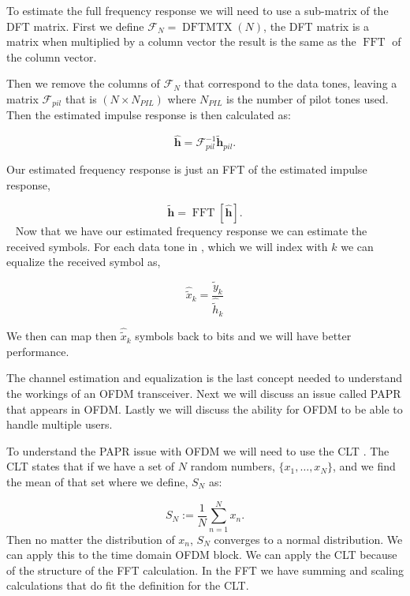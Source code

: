 To estimate the full frequency response we will need to use a sub-matrix of the \ac{DFT} matrix. First we define $\mathbf{\mathcal{F}}_N=\operatorname{DFTMTX}(N)$, the \ac{DFT} matrix is a matrix when multiplied by a column vector the result is the same as the $\operatorname{FFT}$ of the column vector.

Then we remove the columns of $\mathbf{\mathcal{F}}_N$ that correspond to the data tones, leaving a matrix $\mathbf{\mathcal{F}}_{pil}$ that is $(N\times N_{PIL})$ where $N_{PIL}$ is the number of pilot tones used. Then the estimated impulse response is then calculated as:

\begin{equation}
\hat{\mathbf{h}} = \mathbf{\mathcal{F}}_{pil}^{-1}\tilde{\mathbf{h}}_{pil}.
\end{equation}
\noindent

Our estimated frequency response is just an \ac{FFT} of the estimated impulse response,

\begin{equation}
\tilde{\mathbf{h}} = \operatorname{FFT}\left[\hat{\mathbf{h}}\right].
\end{equation}
 
Now that we have our estimated frequency response we can estimate the received symbols. For each data tone in , which we will index with $k$ we can equalize the received symbol as,

\begin{equation}
\hat{\tilde{x}}_k= \frac{\tilde{y}_k}{\hat{\tilde{h}}_k}
\end{equation}

\noindent
We then can map then $\hat{\tilde{x}}_k$ symbols back to bits and we will have better performance.
	
The channel estimation and equalization is the last concept needed to understand the workings of an \ac{OFDM} transceiver. Next we will discuss an issue called \ac{PAPR} that appears in \ac{OFDM}. Lastly we will discuss the ability for \ac{OFDM} to be able to handle multiple users. 

To understand the \ac{PAPR} issue with \ac{OFDM} we will need to use the \ac{CLT} \cite{clt}. The \ac{CLT} states that if we have a set of $N$ random numbers, $\{x_1, \dots, x_N\}$, and we find the mean of that set where we define, $S_N$ as:

\begin{equation}
S_N := \frac{1}{N}\sum_{n=1}^{N}x_n.
\end{equation}
\noindent
Then no matter the distribution of $x_n$, $S_N$ converges to a normal distribution. We can apply this to the time domain \ac{OFDM} block. We can apply the \ac{CLT} because of the structure of the \ac{FFT} calculation. In the \ac{FFT} we have summing and scaling calculations that do fit the definition for the \ac{CLT}.

